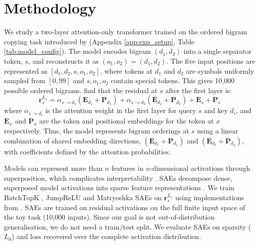 \section{Methodology}\label{s:method}

We study a two-layer attention-only transformer trained on the ordered bigram copying task introduced by \citet{farrell2025order} (Appendix \ref{app:exp_setup}, Table \ref{tab:model_config}). The model encodes bigram $(d_1,d_2)$ into a single separator token, $s$, and reconstructs it as $(o_1,o_2)=(d_1,d_2)$. The five input positions are represented as $[d_1, d_2, s, o_1, o_2]$, where tokens at $d_1$ and $d_2$ are symbols uniformly sampled from $[0,99]$ and $s, o_1, o_2$ contain special tokens. This gives 10,000 possible ordered bigrams.
\citet{farrell2025order} find that the residual at $s$ after the first layer is:
\begin{equation*}
    \boldsymbol r^{L_1}_s = \alpha_{s\to d_1} (\boldsymbol E_{d_1} + \boldsymbol P_{d_1}) + \alpha_{s \to d_2}(\boldsymbol E_{d_2} + \boldsymbol P_{d_2}) + \boldsymbol E_s + \boldsymbol P_s
\end{equation*}
where $\alpha_{s\to d_i}$ is the attention weight in the first layer for query $s$ and key $d_i$, and $\boldsymbol E_{x}$ and $\boldsymbol P_{x}$ are the token and positional embeddings for the token at $x$ respectively.
Thus, the model represents bigram orderings at $s$ using a linear combination of shared embedding directions, $(\boldsymbol E_{d_1} + \boldsymbol P_{d_1})$ and $(\boldsymbol E_{d_2} + \boldsymbol P_{d_2})$, with coefficients defined by the attention probabilities.


Models can represent more than $n$ features in $n$-dimensional activations through superposition, which complicates interpretability \citep{elhage2022toy}. SAEs decompose dense, superposed model activations into sparse feature representations \cite{bricken2023monosemanticity}.
We train BatchTopK \cite{bussmann2024batchtopk}, JumpReLU \cite{rajamanoharan2024jumping} and Matryoshka \cite{bussmann2025learning} SAEs on $\boldsymbol r_{s}^{L_1}$ using implementations from \citet{marks2024dictionary_learning}. 
SAEs are trained on residual activations on the full finite input space of the toy task (10,000 inputs). 
Since our goal is not out-of-distribution generalisation, we do not need a train/test split.
We evaluate SAEs on sparsity ($L_0$) and loss recovered \cite{karvonen2025saebench,ferrando2024primer} over the complete activation distribution.

